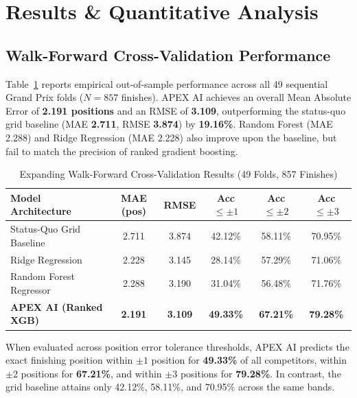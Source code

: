 \documentclass[journal]{IEEEtran}
\begin{document}
\section{Results \& Quantitative Analysis}
\label{sec:results}

\subsection{Walk-Forward Cross-Validation Performance}
Table~\ref{tab:walk_forward_results} reports empirical out-of-sample performance across all 49 sequential Grand Prix folds ($N = 857$ finishes). APEX AI achieves an overall Mean Absolute Error of \textbf{2.191 positions} and an RMSE of \textbf{3.109}, outperforming the status-quo grid baseline (MAE \textbf{2.711}, RMSE \textbf{3.874}) by \textbf{19.16\%}. Random Forest (MAE 2.288) and Ridge Regression (MAE 2.228) also improve upon the baseline, but fail to match the precision of ranked gradient boosting.

\begin{table}[!htbp]
\centering
\caption{Expanding Walk-Forward Cross-Validation Results (49 Folds, 857 Finishes)}
\label{tab:walk_forward_results}
\begin{tabular}{lccccc}
\toprule
\textbf{Model Architecture} & \textbf{MAE (pos)} & \textbf{RMSE} & \textbf{Acc $\le \pm 1$} & \textbf{Acc $\le \pm 2$} & \textbf{Acc $\le \pm 3$} \\
\midrule
Status-Quo Grid Baseline & 2.711 & 3.874 & 42.12\% & 58.11\% & 70.95\% \\
Ridge Regression & 2.228 & 3.145 & 28.14\% & 57.29\% & 71.06\% \\
Random Forest Regressor & 2.288 & 3.190 & 31.04\% & 56.48\% & 71.76\% \\
\textbf{APEX AI (Ranked XGB)} & \textbf{2.191} & \textbf{3.109} & \textbf{49.33\%} & \textbf{67.21\%} & \textbf{79.28\%} \\
\bottomrule
\end{tabular}
\end{table}

When evaluated across position error tolerance thresholds, APEX AI predicts the exact finishing position within $\pm 1$ position for \textbf{49.33\%} of all competitors, within $\pm 2$ positions for \textbf{67.21\%}, and within $\pm 3$ positions for \textbf{79.28\%}. In contrast, the grid baseline attains only 42.12\%, 58.11\%, and 70.95\% across the same bands.
\end{document}
